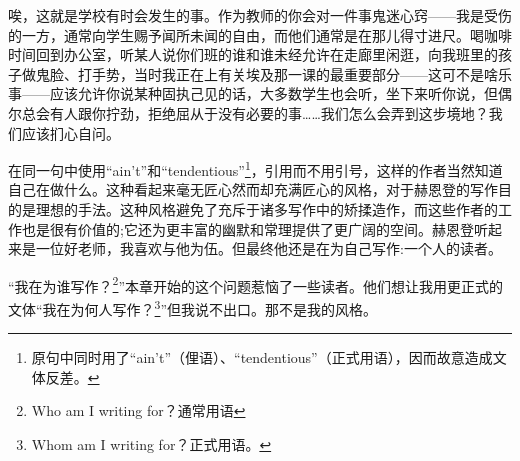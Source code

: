 唉，这就是学校有时会发生的事。作为教师的你会对一件事鬼迷心窍——我是受伤的一方，通常向学生赐予闻所未闻的自由，而他们通常是在那儿得寸进尺。喝咖啡时间回到办公室，听某人说你们班的谁和谁未经允许在走廊里闲逛，向我班里的孩子做鬼脸、打手势，当时我正在上有关埃及那一课的最重要部分——这可不是啥乐事——应该允许你说某种固执己见的话，大多数学生也会听，坐下来听你说，但偶尔总会有人跟你拧劲，拒绝屈从于没有必要的事……我们怎么会弄到这步境地？我们应该扪心自问。

在同一句中使用“ain't”和“tendentious”\footnote{原句中同时用了“ain't”（俚语）、“tendentious”（正式用语），因而故意造成文体反差。}，引用而不用引号，这样的作者当然知道自己在做什么。这种看起来毫无匠心然而却充满匠心的风格，对于赫恩登的写作目的是理想的手法。这种风格避免了充斥于诸多写作中的矫揉造作，而这些作者的工作也是很有价值的;它还为更丰富的幽默和常理提供了更广阔的空间。赫恩登听起来是一位好老师，我喜欢与他为伍。但最终他还是在为自己写作:一个人的读者。

“我在为谁写作？\footnote{Who am I writing for？通常用语}”本章开始的这个问题惹恼了一些读者。他们想让我用更正式的文体“我在为何人写作？\footnote{Whom am I writing for？正式用语。}”但我说不出口。那不是我的风格。
